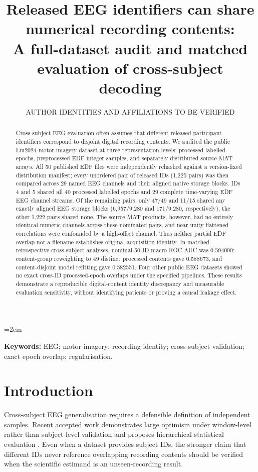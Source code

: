 \documentclass[11pt,a4paper]{article}
\title{Released EEG identifiers can share numerical recording contents:\\
A full-dataset audit and matched evaluation of cross-subject decoding}
\author{AUTHOR IDENTITIES AND AFFILIATIONS TO BE VERIFIED}
\date{}
\begin{document}
\emergencystretch=2em\maketitle
\begin{abstract}
Cross-subject EEG evaluation often assumes that different released
participant identifiers correspond to disjoint digital recording
contents. We audited the public Liu2024 motor-imagery dataset at
three representation levels: processed labelled epochs, preprocessed
EDF integer samples, and separately distributed source MAT arrays.
All 50 published EDF files were independently rehashed against a
version-fixed distribution manifest; every unordered pair of
released IDs (1,225 pairs) was then compared across 29 named EEG
channels and their aligned native storage blocks. IDs 4 and 5
shared all 40 processed labelled epochs and 29 complete
time-varying EDF EEG channel streams. Of the remaining pairs,
only 47/49 and 11/15 shared any exactly aligned EEG storage
blocks (6,957/9,280 and 171/9,280, respectively); the other
1,222 pairs shared none. The source MAT products, however, had
no entirely identical numeric channels across these nominated
pairs, and near-unity flattened correlations were confounded by
a high-offset channel. Thus neither partial EDF overlap nor a
filename establishes original acquisition identity. In matched
retrospective cross-subject analyses, nominal 50-ID macro ROC-AUC
was 0.594000; content-group reweighting to 49 distinct processed
contents gave 0.588673, and content-disjoint model refitting
gave 0.582551. Four other public EEG datasets showed no exact
cross-ID processed-epoch overlaps under the specified pipelines.
These results demonstrate a reproducible digital-content identity
discrepancy and measurable evaluation sensitivity, without
identifying patients or proving a causal leakage effect.
\end{abstract}

\noindent\textbf{Keywords:} EEG; motor imagery; recording identity;
cross-subject validation; exact epoch overlap; regularisation.

\section{Introduction}
Cross-subject EEG generalisation requires a defensible definition of
independent samples. Recent accepted work demonstrates large optimism
under window-level rather than subject-level validation and proposes
hierarchical statistical evaluation \cite{gil2026subjectvalidation}.
Even when a dataset provides subject IDs, the stronger claim that
different IDs never reference overlapping recording contents should be
verified when the scientific estimand is an unseen-recording result.
\end{document}
